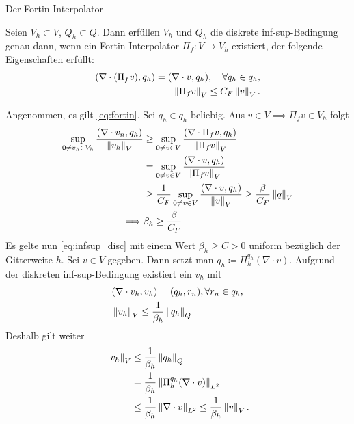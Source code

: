 \begin{bemerkung} Der Fortin-Interpolator
  
Seien $V_{h} \subset V$, $Q_{h} \subset Q$. Dann erfüllen $V_{h}$ und $Q_{h}$ die diskrete inf-sup-Bedingung genau dann, wenn ein Fortin-Interpolator $\Pi_{f}: V \to V_{h}$ existiert, der folgende Eigenschaften erfüllt:
\begin{align}\label{eq:fortin}
  (\nabla\cdot(\Pi_{f} v), q_{h}) = (\nabla \cdot v, q_{h}), \quad \forall q_{h} \in q_{h}, \\
\left \|\Pi_{f} v \right\|_{V} \leq C_{F} \left \|v \right\|_{V}. 
\end{align}
\begin{beweis}
  Angenommen, es gilt \eqref{eq:fortin}. Sei $q_{h} \in q_{h}$ beliebig. Aus $v \in V \implies \Pi_{f} v \in V_{h}$ folgt
  \begin{align*}
    \sup_{0 \neq v_{h} \in V_{h}}\frac{(\nabla \cdot v_{n}, q_{h})}{\left \|v_{h} \right\|_{V}} &\geq \sup_{0 \neq v \in V}\frac{(\nabla \cdot \Pi_{f}v, q_{h})}{\left \|\Pi_{f}v \right\|_{V}}\\
& =   \sup_{0 \neq v \in V}\frac{(\nabla \cdot v, q_{h})}{\left \|\Pi_{f}v \right\|_{V}}\\
& \geq \frac 1 {C_{F}} \sup_{0 \neq v \in V}\frac{(\nabla \cdot v, q_{h})}{\left \|v \right\|_{V}} \geq \frac \beta{C_{F}} \left \|q \right\|_{V}\\
\implies & \beta_{h} \geq \frac \beta {C_{F}}
  \end{align*}
\vspace{5mm}
Es gelte nun \eqref{eq:infsup_disc} mit einem Wert $\beta_{h} \geq C > 0$ uniform bezüglich der Gitterweite $h$. Sei $v \in V$ gegeben. Dann setzt man $q_{h} \coloneqq \Pi_{h}^{q_{h}} (\nabla \cdot v)$. Aufgrund der diskreten inf-sup-Bedingung existiert ein $v_{h}$ mit
\begin{align*}
&  (\nabla \cdot v_{h}, v_{h}) = (q_{h}, r_{n}), \forall r_{n} \in q_{h}, \\
&\left \|v_{h} \right\|_{V} \leq \frac 1 {\beta_{h}} \left \|q_{h} \right\|_{Q}
\end{align*}
Deshalb gilt weiter
\begin{align*}
  \left \|v_{h} \right\|_{V} &\leq \frac 1 {\beta_{h}} \left \|q_{h} \right\|_{Q}\\
 &= \frac 1 {\beta_{h}} \left \|\Pi_{h}^{q_{h}}(\nabla \cdot v) \right\|_{L^{2}}\\
& \leq \frac 1{\beta_{h}} \left \|\nabla \cdot v \right\|_{L^{2}} \leq \frac 1 {\beta_{h}} \left \|v \right\|_{V}. 
\end{align*}
\end{beweis}
\end{bemerkung}
